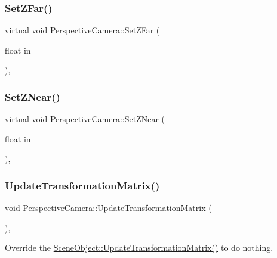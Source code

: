 \subsubsection{\texorpdfstring{Set\+Z\+Far()}{SetZFar()}}
{\footnotesize\ttfamily virtual void Perspective\+Camera\+::\+Set\+Z\+Far (\begin{DoxyParamCaption}\item[{float}]{in }\end{DoxyParamCaption})\hspace{0.3cm}{\ttfamily [inline]}, {\ttfamily [virtual]}}

\hypertarget{class_perspective_camera_ab9bab141c767e0b604b213f482f72c8a}{}\label{class_perspective_camera_ab9bab141c767e0b604b213f482f72c8a} 
\subsubsection{\texorpdfstring{Set\+Z\+Near()}{SetZNear()}}
{\footnotesize\ttfamily virtual void Perspective\+Camera\+::\+Set\+Z\+Near (\begin{DoxyParamCaption}\item[{float}]{in }\end{DoxyParamCaption})\hspace{0.3cm}{\ttfamily [inline]}, {\ttfamily [virtual]}}

\hypertarget{class_perspective_camera_a2f17fb07425e2146d5692805753fa368}{}\label{class_perspective_camera_a2f17fb07425e2146d5692805753fa368} 
\subsubsection{\texorpdfstring{Update\+Transformation\+Matrix()}{UpdateTransformationMatrix()}}
{\footnotesize\ttfamily void Perspective\+Camera\+::\+Update\+Transformation\+Matrix (\begin{DoxyParamCaption}{ }\end{DoxyParamCaption})\hspace{0.3cm}{\ttfamily [protected]}, {\ttfamily [virtual]}}



Override the \hyperlink{class_scene_object_a20e31da3f9d2765de50cdb2d637ae6c9}{Scene\+Object\+::\+Update\+Transformation\+Matrix()} to do nothing. 

